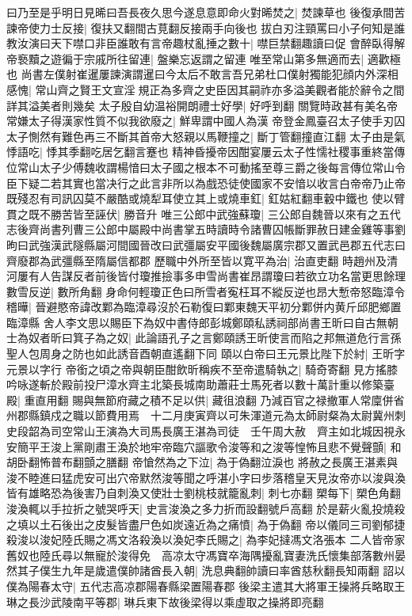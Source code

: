 曰乃至是乎明日見晞曰吾長夜久思今遂息意即命火對晞焚之|{
	焚諫草也}
後復承間苦諫帝使力士反接|{
	復扶又翻間古莧翻反接兩手向後也}
拔白刃注頸罵曰小子何知是誰教汝演曰天下噤口非臣誰敢有言帝趣杖亂捶之數十|{
	噤巨禁翻趣讀曰促}
會醉臥得解帝䙝黷之遊徧于宗戚所往留連|{
	盤樂忘返謂之留連}
唯至常山第多無適而去|{
	適歡極也}
尚書左僕射崔暹屢諫演謂暹曰今太后不敢言吾兄弟杜口僕射獨能犯顔内外深相感愧|{
	常山齊之賢王文宣淫規正為多齊之史臣因其嗣祚亦多溢美觀者能於辭令之間詳其溢美者則幾矣}
太子殷自幼温裕開朗禮士好學|{
	好呼到翻}
關覽時政甚有美名帝常嫌太子得漢家性質不似我欲廢之|{
	鮮卑謂中國人為漢}
帝登金鳳臺召太子使手刃囚太子惻然有難色再三不斷其首帝大怒親以馬鞭撞之|{
	斷丁管翻撞直江翻}
太子由是氣悸語吃|{
	悸其季翻吃居乞翻言蹇也}
精神昏擾帝因酣宴屢云太子性懦社稷事重終當傳位常山太子少傅魏收謂楊愔曰太子國之根本不可動搖至尊三爵之後每言傳位常山令臣下疑二若其實也當决行之此言非所以為戲恐徒使國家不安愔以收言白帝帝乃止帝既殘忍有司訊囚莫不嚴酷或燒犁耳使立其上或燒車釭|{
	釭姑紅翻車轂中鐵也}
使以臂貫之既不勝苦皆至誣伏|{
	勝音升}
唯三公郎中武強蘇瓊|{
	三公郎自魏晉以來有之五代志後齊尚書列曹三公郎中屬殿中尚書掌五時讀時令諸曹囚帳斷罪赦日建金雞等事劉昫曰武強漢武隧縣屬河間國晉改曰武彊屬安平國後魏屬廣宗郡又置武邑郡五代志曰齊廢郡為武彊縣至隋屬信都郡}
歷職中外所至皆以寛平為治|{
	治直吏翻}
時趙州及清河屢有人告謀反者前後皆付瓊推撿事多申雪尚書崔昂謂瓊曰若欲立功名當更思餘理數雪反逆|{
	數所角翻}
身命何輕瓊正色曰所雪者寃枉耳不縱反逆也昂大慙帝怒臨漳令稽曄|{
	晉避愍帝諱改鄴為臨漳尋沒於石勒復曰鄴東魏天平初分鄴併内黄斤邱肥鄉置臨漳縣}
舍人李文思以賜臣下為奴中書侍郎彭城鄭頤私誘祠部尚書王昕曰自古無朝士為奴者昕曰箕子為之奴|{
	此論語孔子之言鄭頤誘王昕使言而陷之邦無道危行言孫聖人包周身之防也如此誘音酉朝直遙翻下同}
頤以白帝曰王元景比陛下於紂|{
	王昕字元景以字行}
帝銜之頃之帝與朝臣酣飲昕稱疾不至帝遣騎執之|{
	騎奇寄翻}
見方搖膝吟咏遂斬於殿前投尸漳水齊主北築長城南助蕭莊士馬死者以數十萬計重以修築臺殿|{
	重直用翻}
賜與無節府藏之積不足以供|{
	藏徂浪翻}
乃減百官之禄撤軍人常廩併省州郡縣鎮戍之職以節費用焉　十二月庚寅齊以可朱渾道元為太師尉粲為太尉冀州刺史段韶為司空常山王演為大司馬長廣王湛為司徒　壬午周大赦　齊主如北城因視永安簡平王浚上黨剛肅王渙於地牢帝臨穴謳歌令浚等和之浚等惶怖且悲不覺聲顫|{
	和胡卧翻怖普布翻顫之膳翻}
帝愴然為之下泣|{
	為于偽翻泣淚也}
將赦之長廣王湛素與浚不睦進曰猛虎安可出穴帝默然浚等聞之呼湛小字曰步落稽皇天見汝帝亦以浚與渙皆有雄略恐為後害乃自刺渙又使壯士劉桃枝就籠亂刺|{
	刺七亦翻}
槊每下|{
	槊色角翻}
浚渙輒以手拉折之號哭呼天|{
	史言浚渙之多力折而設翻號戶高翻}
於是薪火亂投燒殺之填以土石後出之皮髮皆盡尸色如炭遠近為之痛憤|{
	為于偽翻}
帝以儀同三司劉郁捷殺浚以浚妃陸氏賜之馮文洛殺渙以渙妃李氏賜之|{
	為李妃撻馮文洛張本}
二人皆帝家舊奴也陸氏尋以無寵於浚得免　高凉太守馮寶卒海隅擾亂寶妻洗氏懷集部落數州晏然其子僕生九年是歲遣僕帥諸酋長入朝|{
	洗息典翻帥讀曰率酋慈秋翻長知兩翻}
詔以僕為陽春太守|{
	五代志高凉郡陽春縣梁置陽春郡}
後梁主遣其大將軍王操將兵略取王琳之長沙武陵南平等郡|{
	琳兵東下故後梁得以乘虛取之操將即亮翻}


